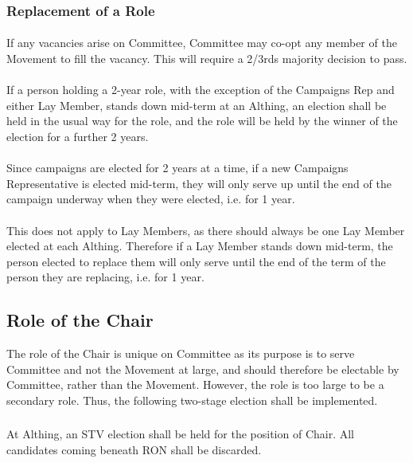 \documentclass[a4paper, 11pt]{report}
\begin{document}
\subsubsection{Replacement of a Role}
\label{sec:rolereplacement}
\paragraph{} If any vacancies arise on Committee, Committee may co-opt any member of the Movement to fill the vacancy. This will require a 2/3rds majority decision to pass.
\paragraph{} If a person holding a 2-year role, with the exception of the Campaigns Rep and either Lay Member, stands down mid-term at an Althing, an election shall be held in the usual way for the role, and the role will be held by the winner of the election for a further 2 years.
\paragraph{} Since campaigns are elected for 2 years at a time, if a new Campaigns Representative is elected mid-term, they will only serve up until the end of the campaign underway when they were elected, i.e. for 1 year.
\paragraph{} This does not apply to Lay Members, as there should always be one Lay Member elected at each Althing. Therefore if a Lay Member stands down mid-term, the person elected to replace them will only serve until the end of the term of the person they are replacing, i.e. for 1 year.

\subsection{Role of the Chair}
\label{sec:chair}

The role of the Chair is unique on Committee as its purpose is to serve Committee and not the Movement at large, and should therefore be electable by Committee, rather than the Movement.  However, the role is too large to be a secondary role.  Thus, the following two-stage election shall be implemented.

\subsubsection{}
At Althing, an STV election shall be held for the position of Chair.  All candidates coming beneath RON shall be discarded.
\end{document}
